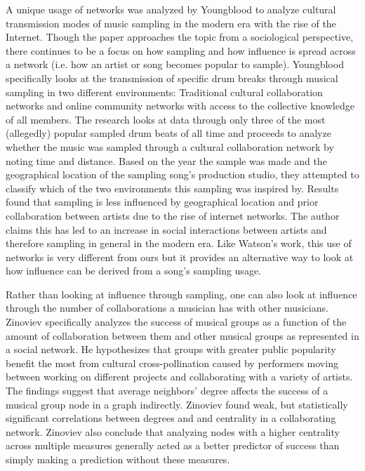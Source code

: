 \documentclass[pageno]{jpaper}
\begin{document}
A unique usage of networks was analyzed by Youngblood to analyze cultural transmission modes of music sampling in the modern era with the rise of the Internet. \cite{Youngblood} Though the paper approaches the topic from a sociological perspective, there continues to be a focus on how sampling and how influence is spread across a network (i.e. how an artist or song becomes popular to sample). Youngblood specifically looks at the transmission of specific drum breaks through musical sampling in two different environments: Traditional cultural collaboration networks and online community networks with access to the collective knowledge of all members. The research looks at data through only three of the most (allegedly) popular sampled drum beats of all time and proceeds to analyze whether the music was sampled through a cultural collaboration network by noting time and distance. Based on the year the sample was made and the geographical location of the sampling song's production studio, they attempted to classify which of the two environments this sampling was inspired by. Results found that sampling is less influenced by geographical location and prior collaboration between artists due to the rise of internet networks. The author claims this has led to an increase in social interactions between artists and therefore sampling in general in the modern era. Like Watson's work, this use of networks is very different from ours but it provides an alternative way to look at how influence can be derived from a song's sampling usage.


Rather than looking at influence through sampling, one can also look at influence through the number of collaborations a musician has with other musicians. Zinoviev specifically analyzes the success of musical groups as a function of the amount of collaboration between them and other musical groups as represented in a social network. \cite{Zinoviev} He hypothesizes that groups with greater public popularity benefit the most from cultural cross-pollination caused by performers moving between working on different projects and collaborating with a variety of artists. The findings suggest that average neighbors' degree affects the success of a musical group node in a graph indirectly. Zinoviev found weak, but statistically significant correlations between degrees and and centrality in a collaborating network. Zinoviev also conclude that analyzing nodes with a higher centrality across multiple measures generally acted as a better predictor of success than simply making a prediction without these measures. 
\end{document}
